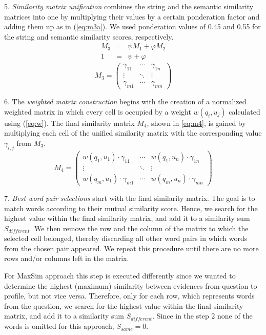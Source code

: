 \documentclass[conference]{IEEEtran}
\begin{document}
5. {\it Similarity matrix unification} combines the string and the semantic similarity matrices into one by multiplying their values by a certain ponderation factor and adding them up as in (\ref{eq:m3a}). We used ponderation values of 0.45 and 0.55 for the string and semantic similarity scores, respectively.
\begin{eqnarray}
	\label{eq:m3a}
	M_3 & = & \psi M_1 + \varphi M_2 \\
	1 & = & \psi + \varphi
\end{eqnarray}
\begin{equation}
	\label{eq:m3b}
	M_3 = 
\left( 
	\begin{array}{ccc}
		\gamma_{11} & \cdots & \gamma_{1n} \\
		\vdots & \ddots & \vdots \\
		\gamma_{m1} & \cdots & \gamma_{mn} 
	\end{array} 
\right)
\end{equation}

6. The {\it weighted matrix construction} begins with the creation of a normalized weighted matrix in which every cell is occupied by a weight $w(q_i,u_j)$ calculated using (\ref{eq:w}). The final similarity matrix $M_4$, shown in \ref{eq:m4}, is gained by multiplying each cell of the unified similarity matrix with the corresponding value $\gamma_{i,j}$ from $M_3$.
\begin{equation}
	\label{eq:m4}
	M_4 = 
\left( 
	\begin{array}{ccc}
		w(q_1,u_1)\cdot \gamma_{11} & \cdots & w(q_1,u_n)\cdot \gamma_{1n} \\
		\vdots & \ddots & \vdots \\
		w(q_m,u_1)\cdot \gamma_{m1} & \cdots & w(q_m,u_n)\cdot \gamma_{mn} 
	\end{array} 
\right)
\end{equation}

7. {\it Best word pair selections} start with the final similarity matrix. The goal is to match words according to their mutual similarity score. Hence, we search for the highest value within the final similarity matrix, and add it to a similarity sum $S_{different}$. We then remove the row and the column of the matrix to which the selected cell belonged, thereby discarding all other word pairs in which words from the chosen pair appeared. We repeat this procedure until there are no more rows and/or columns left in the matrix.
 
For MaxSim approach this step is executed differently since we wanted to determine the highest (maximum) similarity between evidences from question to profile, but not vice versa. Therefore, only for each row, which represents words from the question, we search for the highest value within the final similarity matrix, and add it to a similarity sum $S_{different}$. Since in the step 2 none of the words is omitted for this approach, $S_{same}=0$.
 
\end{document}
